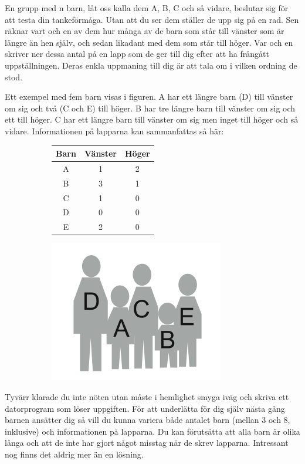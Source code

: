 En grupp med n barn, låt oss kalla dem A, B, C och så vidare, beslutar sig för att testa din tankeförmåga.
Utan att du ser dem ställer de upp sig på en rad.
Sen räknar vart och en av dem hur många av de barn som står till vänster som är längre än hen själv, och sedan likadant med dem som står till höger.
Var och en skriver ner dessa antal på en lapp som de ger till dig efter att ha frångått uppställningen.
Deras enkla uppmaning till dig är att tala om i vilken ordning de stod.

Ett exempel med fem barn visas i figuren.
A har ett längre barn (D) till vänster om sig och två (C och E) till höger.
B har tre längre barn till vänster om sig och ett till höger.
C har ett längre barn till vänster om sig men inget till höger och så vidare.
Informationen på lapparna kan sammanfattas så här:

\begin{figure}[h!]
  \centering
  \begin{subfigure}{}
    \begin{tabular}[b]{|c|c|c|}
    \hline
      Barn&Vänster&Höger\\\hline
      A&1&2\\
      B&3&1\\
      C&1&0\\
      D&0&0\\
      E&2&0\\\hline
    \end{tabular}
  \end{subfigure}
  \hspace{2cm}
  \begin{subfigure}{}
    \includegraphics[scale=0.4]{uppstallning}
  \end{subfigure}
\end{figure}

Tyvärr klarade du inte nöten utan måste i hemlighet smyga iväg och skriva ett datorprogram som löser uppgiften.
För att underlätta för dig själv nästa gång barnen ansätter dig så vill du kunna variera både antalet barn (mellan 3 och 8, inklusive) och informationen på lapparna.
Du kan förutsätta att alla barn är olika långa och att de inte har gjort något misstag när de skrev lapparna.
Intressant nog finns det aldrig mer än en lösning.

